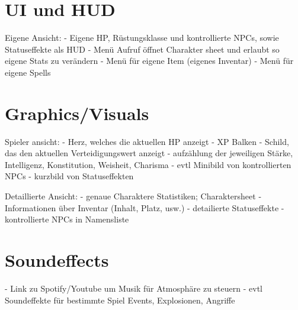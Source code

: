 \documentclass[11pt]{article}
\begin{document}
    \section{UI und HUD}
    Eigene Ansicht:
    - Eigene HP, Rüstungsklasse und kontrollierte NPCs, sowie Statuseffekte als HUD
    - Menü Aufruf öffnet Charakter sheet und erlaubt so eigene Stats zu verändern
    - Menü für eigene Item (eigenes Inventar)
    - Menü für eigene Spells

    \section{Graphics/Visuals}
    Spieler ansicht:
    - Herz, welches die aktuellen HP anzeigt
    - XP Balken
    - Schild, das den aktuellen Verteidigungswert anzeigt
    - aufzählung der jeweiligen Stärke, Intelligenz, Konstitution, Weisheit, Charisma
    - evtl Minibild von kontrollierten NPCs
    - kurzbild von Statuseffekten

    Detaillierte Ansicht:
    - genaue Charaktere Statistiken; Charaktersheet
    - Informationen über Inventar (Inhalt, Platz, usw.)
    - detailierte Statuseffekte
    - kontrollierte NPCs in Namensliste

    \section{Soundeffects}
    - Link zu Spotify/Youtube um Musik für Atmosphäre zu steuern
    - evtl Soundeffekte für bestimmte Spiel Events, Explosionen, Angriffe
\end{document}
